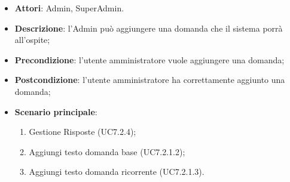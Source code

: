 \documentclass[../AnalisiDeiRequisiti_v4.0.0.tex]{subfiles}
\begin{document}
\begin{itemize} 
\item \textbf{Attori}: Admin, SuperAdmin.
\item \textbf{Descrizione}: l'Admin può aggiungere una domanda che il sistema porrà all'ospite;
\item \textbf{Precondizione}: l'utente amministratore vuole aggiungere una domanda;
\item \textbf{Postcondizione}: l'utente amministratore ha correttamente aggiunto una domanda;
\item \textbf{Scenario principale}: \begin{enumerate}\item Gestione Risposte (UC7.2.4);\item Aggiungi testo domanda base (UC7.2.1.2);\item Aggiungi testo domanda ricorrente (UC7.2.1.3).
\end{enumerate}
\newpage

\end{itemize}
\end{document}
